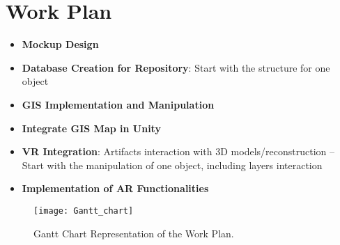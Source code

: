 
%

\chapter{Work Plan}
\label{cha:work_plan}


\begin{itemize}
    \item \textbf{Mockup Design}
    \item \textbf{Database Creation for Repository}: Start with the structure for one object
    \item \textbf{GIS Implementation and Manipulation}
    \item \textbf{Integrate GIS Map in Unity}
    \item \textbf{VR Integration}: Artifacts interaction with 3D models/reconstruction – Start with the manipulation of one object, including layers interaction
    \item \textbf{Implementation of AR Functionalities}
\end{itemize}

\begin{figure}[h!]
    \centering
    \texttt{[image: Gantt\_chart]}
    \caption{Gantt Chart Representation of the Work Plan.}
    \label{fig:gantt_chart}
  \end{figure}
  \FloatBarrier